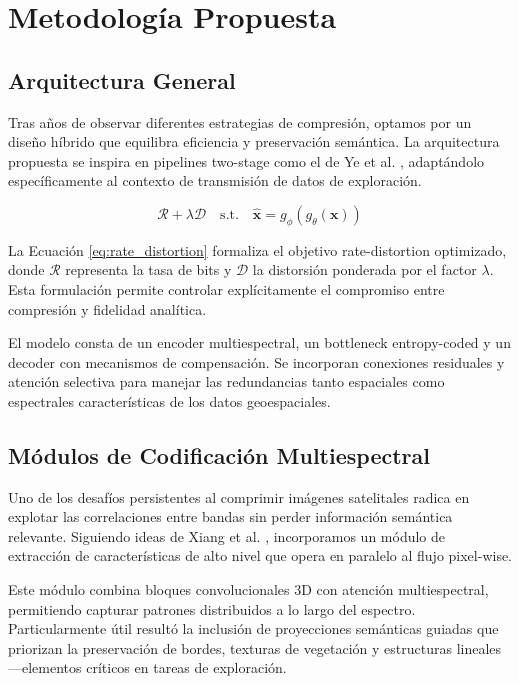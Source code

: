 \section{Metodología Propuesta}

\subsection{Arquitectura General}

Tras años de observar diferentes estrategias de compresión, optamos por un diseño híbrido que equilibra eficiencia y preservación semántica. La arquitectura propuesta se inspira en pipelines two-stage como el de Ye et al. \cite{Ye2025_MAPC}, adaptándolo específicamente al contexto de transmisión de datos de exploración.

\begin{equation}
\mathcal{R} + \lambda \mathcal{D} \quad \text{s.t.} \quad \hat{\mathbf{x}} = g_{\phi}(g_{\theta}(\mathbf{x}))
\label{eq:rate_distortion}
\end{equation}

La Ecuación \eqref{eq:rate_distortion} formaliza el objetivo rate-distortion optimizado, donde \(\mathcal{R}\) representa la tasa de bits y \(\mathcal{D}\) la distorsión ponderada por el factor \(\lambda\). Esta formulación permite controlar explícitamente el compromiso entre compresión y fidelidad analítica.

El modelo consta de un encoder multiespectral, un bottleneck entropy-coded y un decoder con mecanismos de compensación. Se incorporan conexiones residuales y atención selectiva para manejar las redundancias tanto espaciales como espectrales características de los datos geoespaciales.

\subsection{Módulos de Codificación Multiespectral}

Uno de los desafíos persistentes al comprimir imágenes satelitales radica en explotar las correlaciones entre bandas sin perder información semántica relevante. Siguiendo ideas de Xiang et al. \cite{Xiang2024_HL_RSCompNet}, incorporamos un módulo de extracción de características de alto nivel que opera en paralelo al flujo pixel-wise.

Este módulo combina bloques convolucionales 3D con atención multiespectral, permitiendo capturar patrones distribuidos a lo largo del espectro. Particularmente útil resultó la inclusión de proyecciones semánticas guiadas que priorizan la preservación de bordes, texturas de vegetación y estructuras lineales —elementos críticos en tareas de exploración.

